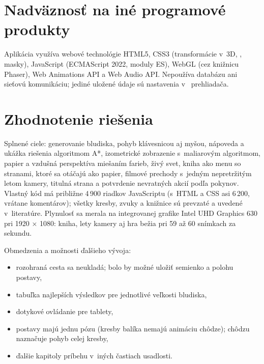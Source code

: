 \documentclass[11pt, a4paper]{article}
\begin{document}
\section{Nadväznosť na iné programové produkty}

Aplikácia využíva webové technológie HTML5, CSS3 (transformácie v~3D, ,
masky), JavaScript (ECMAScript 2022, moduly ES), WebGL (cez knižnicu Phaser), Web Animations API
a Web Audio API. Nepoužíva databázu ani sieťovú komunikáciu; jediné uložené údaje sú
nastavenia v~ prehliadača.

\section{Zhodnotenie riešenia}

Splnené ciele: generovanie bludiska, pohyb klávesnicou aj myšou, nápoveda a ukážka riešenia
algoritmom A*, izometrické zobrazenie s~maliarovým algoritmom, papier a vzdušná perspektíva
miešaním farieb, živý svet, kniha ako menu so stranami, ktoré sa otáčajú ako papier, filmové
prechody s~jedným nepretržitým letom kamery, titulná strana a potvrdenie nevratných akcií podľa
pokynov. Vlastný kód má približne 4\,900 riadkov JavaScriptu (s~HTML a CSS asi 6\,200, vrátane
komentárov); všetky kresby, zvuky a knižnice sú prevzaté a uvedené v~literatúre. Plynulosť sa
merala na integrovanej grafike Intel UHD Graphics 630 pri 1920 × 1080: kniha, lety kamery aj hra
bežia pri 59 až 60 snímkach za sekundu.

Obmedzenia a možnosti ďalšieho vývoja:
\begin{itemize}
  \item rozohraná cesta sa neukladá; bolo by možné uložiť semienko a polohu postavy,
  \item tabuľka najlepších výsledkov pre jednotlivé veľkosti bludiska,
  \item dotykové ovládanie pre tablety,
  \item postavy majú jednu pózu (kresby balíka nemajú animáciu chôdze); chôdzu naznačuje pohyb
    celej kresby,
  \item ďalšie kapitoly príbehu v~iných častiach usadlosti.
\end{itemize}

\printbibliography[heading=bibnumbered, title={Zoznam použitej literatúry}]
\end{document}
